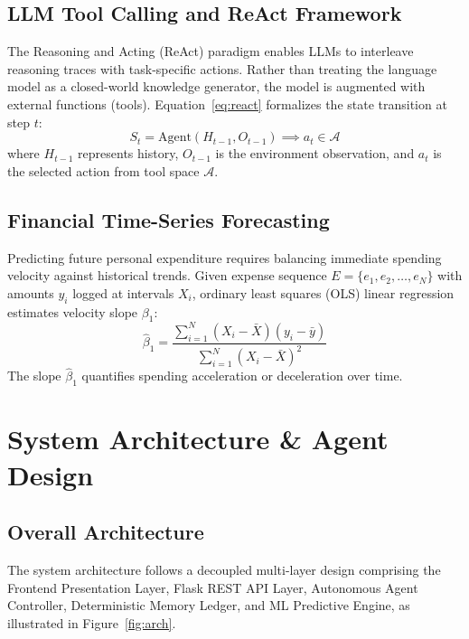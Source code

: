 \documentclass[12pt,a4paper,oneside]{report}
\begin{document}
\section{LLM Tool Calling and ReAct Framework}
The Reasoning and Acting (ReAct) paradigm enables LLMs to interleave reasoning traces with task-specific actions. Rather than treating the language model as a closed-world knowledge generator, the model is augmented with external functions (tools). Equation~\ref{eq:react} formalizes the state transition at step $t$:
\begin{equation}
\label{eq:react}
S_t = \text{Agent}(H_{t-1}, O_{t-1}) \implies a_t \in \mathcal{A}
\end{equation}
where $H_{t-1}$ represents history, $O_{t-1}$ is the environment observation, and $a_t$ is the selected action from tool space $\mathcal{A}$.

\section{Financial Time-Series Forecasting}
Predicting future personal expenditure requires balancing immediate spending velocity against historical trends. Given expense sequence $E = \{e_1, e_2, \dots, e_N\}$ with amounts $y_i$ logged at intervals $X_i$, ordinary least squares (OLS) linear regression estimates velocity slope $\beta_1$:
\begin{equation}
\label{eq:ols}
\hat{\beta}_1 = \frac{\sum_{i=1}^N (X_i - \bar{X})(y_i - \bar{y})}{\sum_{i=1}^N (X_i - \bar{X})^2}
\end{equation}
The slope $\hat{\beta}_1$ quantifies spending acceleration or deceleration over time.

\chapter{System Architecture \& Agent Design}
\label{chap:arch}

\section{Overall Architecture}
The system architecture follows a decoupled multi-layer design comprising the Frontend Presentation Layer, Flask REST API Layer, Autonomous Agent Controller, Deterministic Memory Ledger, and ML Predictive Engine, as illustrated in Figure~\ref{fig:arch}.
\end{document}
